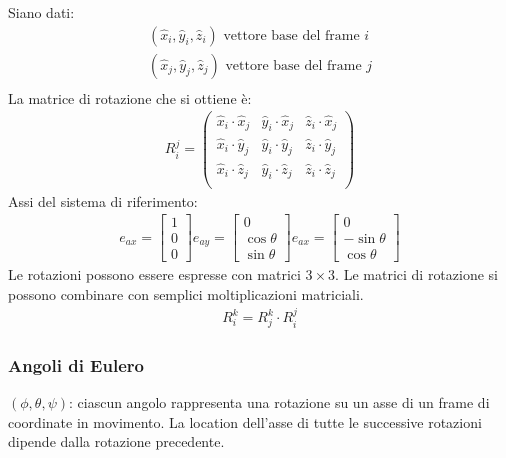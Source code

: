 \documentclass[a4paper,portrait,12pt]{article}
\theoremstyle{definition}
\begin{document}
Siano dati:
\begin{align*}
(\hat{x}_i, \hat{y}_i, \hat{z}_i) \text{ vettore base del frame }i\\
(\hat{x}_j, \hat{y}_j, \hat{z}_j) \text{ vettore base del frame }j\\
\end{align*}
La matrice di rotazione che si ottiene è:
\begin{align*}
R_i^j = \left(
\begin{array}{ccc}
\hat{x}_i\cdot\hat{x}_j & \hat{y}_i\cdot\hat{x}_j & \hat{z}_i\cdot\hat{x}_j \\
\hat{x}_i\cdot\hat{y}_j & \hat{y}_i\cdot\hat{y}_j & \hat{z}_i\cdot\hat{y}_j \\
\hat{x}_i\cdot\hat{z}_j & \hat{y}_i\cdot\hat{z}_j & \hat{z}_i\cdot\hat{z}_j \\
\end{array}\right)
\end{align*}
Assi del sistema di riferimento:
\begin{align*}
e_{ax} = \left[
\begin{array}{c}
1\\
0\\
0
\end{array}\right]
e_{ay} = \left[
\begin{array}{c}
0\\
\cos{\theta}\\
\sin{\theta}
\end{array}\right]
e_{ax} = \left[
\begin{array}{c}
0\\
-\sin{\theta}\\
\cos{\theta}
\end{array}\right]
\end{align*}
Le rotazioni possono essere espresse con matrici $3\times 3$.
Le matrici di rotazione si possono combinare con semplici moltiplicazioni matriciali.
\begin{align*}
R_i^k = R_j^k \cdot R_i^j
\end{align*}

\subsubsection{Angoli di Eulero}

$(\phi, \theta, \psi)$: ciascun angolo rappresenta una rotazione su un asse di un frame di coordinate in movimento.
La location dell'asse di tutte le successive rotazioni dipende dalla rotazione precedente.\\
\end{document}
